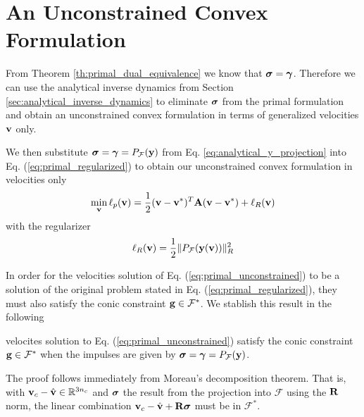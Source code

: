\section{An Unconstrained Convex Formulation}
\label{sec:unconstrained_convex_formulation}

From Theorem \ref{th:primal_dual_equivalence} we know that ${\bm\sigma} = {\bm\gamma}$.
Therefore we can use the analytical inverse dynamics from Section
\ref{sec:analytical_inverse_dynamics} to eliminate ${\bm\sigma}$ from the primal
formulation and obtain an unconstrained convex formulation in terms of
generalized velocities ${\mathbf{v}}$ only.

We then substitute ${\bm\sigma}={\bm\gamma}=P_\mathcal{F}({\mathbf{y}})$ from Eq.
\ref{eq:analytical_y_projection} into Eq. (\ref{eq:primal_regularized}) to
obtain our unconstrained convex formulation in velocities only
\begin{eqnarray}
	\min_{\mf{v}} \ell_p(\mf{v}) =
	\frac{1}{2}(\mf{v}-\mf{v}^*)^T\mf{A}(\mf{v}-\mf{v}^*) +
	\ell_R(\mf{v})
	\label{eq:primal_unconstrained}
\end{eqnarray}
with the regularizer
\begin{equation}
	\ell_R({\mathbf{v}}) = \frac{1}{2}\Vert P_\mathcal{F}({\mathbf{y}}({\mathbf{v}}))\Vert_R^2
\end{equation}

In order for the velocities solution of Eq. (\ref{eq:primal_unconstrained}) to
be a solution of the original problem stated in Eq.
(\ref{eq:primal_regularized}), they must also satisfy the conic constraint
${\mathbf{g}}\in\mathcal{F}^*$. We stablish this result in the following
\begin{lemma}
    velocites solution to Eq. (\ref{eq:primal_unconstrained}) satisfy the conic
    constraint ${\mathbf{g}}\in\mathcal{F}^*$ when the impulses are given by
    ${\bm\sigma}={\bm\gamma}=P_\mathcal{F}({\mathbf{y}})$.
    \label{lemma:conic_constraints_are_satisfied_analytically}
\end{lemma}
\begin{IEEEproof}
    The proof follows immediately from Moreau's decomposition theorem. That is,
    with ${\mathbf{v}}_c - \hat{{\mathbf{v}}}\in\mathbb{R}^{3n_c}$ and ${\bm\sigma}$ the result
    from the projection into $\mathcal{F}$ using the ${\mathbf{R}}$ norm, the linear
    combination ${\mathbf{v}}_c - \hat{{\mathbf{v}}} + {\mathbf{R}}{\bm\sigma}$ must be in
    $\mathcal{F}^*$.
\end{IEEEproof}


